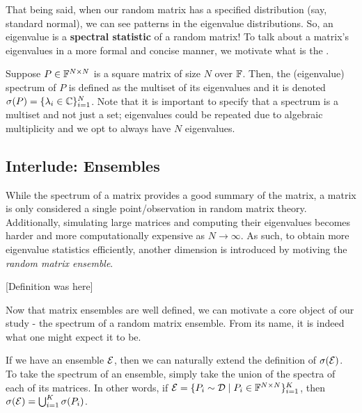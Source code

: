 That being said, when our random matrix has a specified distribution (say, standard normal), we can see patterns in the eigenvalue distributions. So, an eigenvalue is a \textbf{spectral statistic} of a random matrix! To talk about a matrix's eigenvalues in a more formal and concise manner, we motivate what is the .

\newpage

\begin{definition}[Spectrum]
Suppose $P \in \mathbb{F}^{N \times N}$ is a square matrix of size $N$ over $\mathbb{F}$. Then, the (eigenvalue) spectrum of $P$ is defined as the multiset of its eigenvalues and it is denoted $\sigma(P) = \{\lambda_i  \in \mathbb{C}\}_{i=1}^N$. Note that it is important to specify that a spectrum is a multiset and not just a set; eigenvalues could be repeated due to algebraic multiplicity and we opt to always have $N$ eigenvalues. 
\end{definition}


\subsection{Interlude: Ensembles}
While the spectrum of a matrix provides a good summary of the matrix, a matrix is only considered a single point/observation in random matrix theory. Additionally, simulating large matrices and computing their eigenvalues becomes harder and more computationally expensive as $N \to \infty$. As such, to obtain more eigenvalue statistics efficiently, another dimension is introduced by motiving the \textit{random matrix ensemble}.

[Definition was here]

Now that matrix ensembles are well defined, we can motivate a core object of our study - the spectrum of a random matrix ensemble. From its name, it is indeed what one might expect it to be.

\begin{definition}
If we have an ensemble $\mathcal{E}$, then we can naturally extend the definition of $\sigma(\mathcal{E})$. To take the spectrum of an ensemble, simply take the union of the spectra of each of its matrices. In other words, if $\mathcal{E} = \{P_i \sim \mathcal{D} \mid P_i \in \mathbb{F}^{N \times N}\}_{i = 1}^K$, then $\sigma(\mathcal{E}) = \bigcup_{i=1}^K \sigma(P_i)$.
\end{definition}


